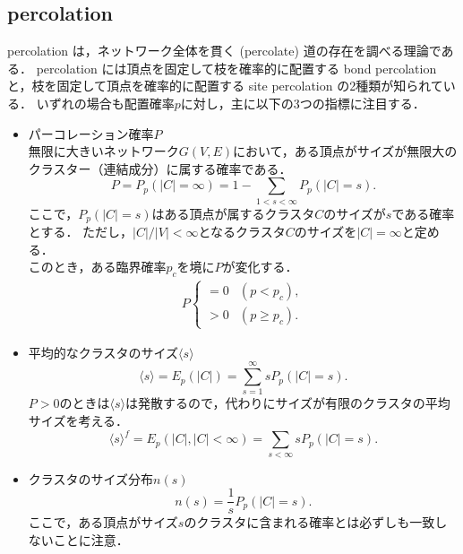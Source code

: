 \documentclass[../main]{subfiles}
\begin{document}
\subsection{percolation}
percolation は，ネットワーク全体を貫く (percolate) 道の存在を調べる理論である．
percolation には頂点を固定して枝を確率的に配置する bond percolation と，枝を固定して頂点を確率的に配置する site percolation の2種類が知られている．
いずれの場合も配置確率$p$に対し，主に以下の3つの指標に注目する．
\begin{itemize}
    \item パーコレーション確率$P$\\
        無限に大きいネットワーク$G(V,E)$において，ある頂点がサイズが無限大のクラスター（連結成分）に属する確率である．
        \begin{equation}
            P=P_p(|C|=\infty)=1-\sum_{1<s<\infty}P_p(|C|=s).
        \end{equation} 
        ここで，$P_p(|C|=s)$はある頂点が属するクラスタ$C$のサイズが$s$である確率とする．
        ただし，$|C|/|V|<\infty$となるクラスタ$C$のサイズを$|C|=\infty$と定める．\\
        このとき，ある臨界確率$p_c$を境に$P$が変化する．
        \begin{align}
            P
            \begin{cases}
                = 0 & (p<p_c),\\
                > 0 & (p\geq p_c).
            \end{cases}
        \end{align}
    \item 平均的なクラスタのサイズ$\langle s \rangle$
        \begin{equation}
            \langle s\rangle =E_p(|C|)=\sum_{s=1}^\infty sP_p(|C|=s).
        \end{equation}
        $P>0$のときは$\langle s\rangle$は発散するので，代わりにサイズが有限のクラスタの平均サイズを考える．
        \begin{equation}
            \langle s\rangle^f =E_p(|C|,|C|<\infty)=\sum_{s<\infty} sP_p(|C|=s).            
        \end{equation}
    \item クラスタのサイズ分布$n(s)$
    \begin{equation}
        n(s)=\frac{1}{s}P_p(|C|=s).
    \end{equation}
    ここで，ある頂点がサイズ$s$のクラスタに含まれる確率とは必ずしも一致しないことに注意．
\end{itemize}
\end{document}
